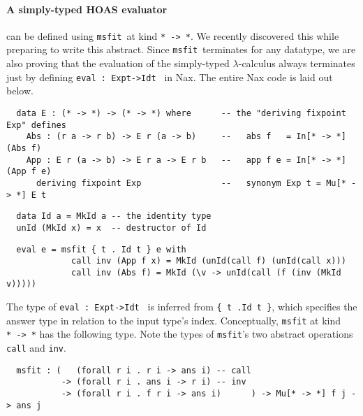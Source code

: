 \documentclass[a4paper]{easychair} %
\newcommand{\msfit}[0]{\texttt{msfit}}
\begin{document}
\paragraph{A simply-typed HOAS evaluator\!\!\!} can be defined
using \msfit\ at kind \texttt{*\,->\,*}. We recently discovered this
while preparing to write this abstract. Since \msfit\ terminates
for any datatype, we are also proving that the evaluation of
the simply-typed $\lambda$-calculus always terminates
just by defining \texttt{eval\,:\,Exp\;t\;->\;Id\;t\,} in Nax.
The entire Nax code is laid out below.
\vspace*{-.5ex}
{\small
\begin{verbatim}
  data E : (* -> *) -> (* -> *) where      -- the "deriving fixpoint Exp" defines
    Abs : (r a -> r b) -> E r (a -> b)     --   abs f   = In[* -> *] (Abs f)
    App : E r (a -> b) -> E r a -> E r b   --   app f e = In[* -> *] (App f e)
      deriving fixpoint Exp                --   synonym Exp t = Mu[* -> *] E t
\end{verbatim}
\vspace*{-2ex}
\begin{verbatim}
  data Id a = MkId a -- the identity type
  unId (MkId x) = x  -- destructor of Id
\end{verbatim}
\vspace*{-2ex}
\begin{verbatim}
  eval e = msfit { t . Id t } e with
             call inv (App f x) = MkId (unId(call f) (unId(call x)))
             call inv (Abs f) = MkId (\v -> unId(call (f (inv (MkId v)))))
\end{verbatim} }
\vspace*{-.5ex}
\noindent
The type of \texttt{eval\,:\,Exp\;t\;->\;Id\;t\,} is inferred from
\texttt{\{\,t\,.\;Id t\,\}}, which specifies the answer type in relation
to the input type's index.
Conceptually, \texttt{msfit} at kind \texttt{*\,->\,*} has the following type.
Note the types of \texttt{msfit}'s two abstract operations
\texttt{call} and \texttt{inv}.
{\small
\begin{verbatim}
  msfit : (   (forall r i . r i -> ans i) -- call
           -> (forall r i . ans i -> r i) -- inv
           -> (forall r i . f r i -> ans i)      ) -> Mu[* -> *] f j -> ans j
\end{verbatim} }
\vspace*{-3ex}
\end{document}
